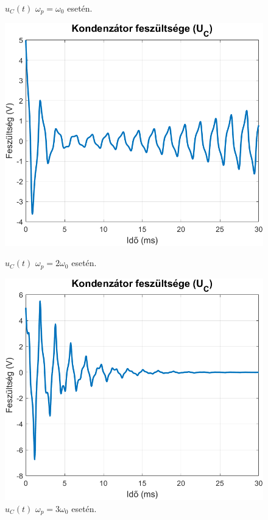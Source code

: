 \documentclass[12pt,a4paper]{article}
\begin{document}
\begin{figure}[H]
\begin{minipage}{0.5\textwidth}
        \caption{$u_C(t)$ $\omega_p = \omega_0$ esetén.}
        \label{fig:omega0}
    \end{minipage}
    \vfill
    \begin{minipage}{0.5\textwidth}
        \centering
        \includegraphics[width=\textwidth]{figures/2.png}
        \caption{$u_C(t)$ $\omega_p = 2\omega_0$ esetén.}
        \label{fig:2omega0}
    \end{minipage}%
    \begin{minipage}{0.5\textwidth}
        \centering
        \includegraphics[width=\textwidth]{figures/3.png}
        \caption{$u_C(t)$ $\omega_p = 3\omega_0$ esetén.}
        \label{fig:3omega0}
    \end{minipage}
\end{figure}
\end{document}
